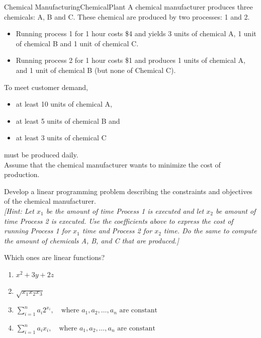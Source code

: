 \begin{ex}{Chemical Manufacturing}{ChemicalPlant}{}
\label{ex:ChemicalPlant}
 A chemical manufacturer produces three chemicals: A, B and C. These chemical are produced by two processes: 1 and 2. 
\begin{itemize}
\item Running process 1 for 1 hour costs \$4 and yields 3 units of chemical A, 1 unit of chemical B and 1 unit of chemical C. 
\item Running process 2 for 1 hour costs \$1 and produces 1 units of chemical A, and 1 unit of chemical B (but none of Chemical C). 
\end{itemize}
To meet customer demand, 
\begin{itemize}
\item at least 10 units of chemical A, 
\item at least 5 units of chemical B and 
\item at least 3 units of chemical C
\end{itemize}
must be produced daily.\\

 Assume that the chemical manufacturer wants to minimize the cost of production. 

Develop a linear programming problem describing the constraints and objectives of the chemical manufacturer. \\


\emph{[Hint: Let $x_1$ be the amount of time Process 1 is executed and let $x_2$ be amount of time Process 2 is executed. Use the coefficients above to express the cost of running Process 1 for $x_1$ time and Process 2 for $x_2$ time. Do the same to compute the amount of chemicals A, B, and C that are produced.]}
\end{ex}


\begin{ex}{}{}
Which ones are linear functions?
\begin{enumerate}
    \item $x^2 + 3y + 2z$
    \item $\sqrt{x_1 x_2 x_3}$
    \item $\sum_{i=1}^n a_i 2^{x_i}, \quad \text{where } a_1, a_2, \dots, a_n \text{ are constant}$
    \item $\sum_{i=1}^n a_i x_i, \quad \text{where } a_1, a_2, \dots, a_n \text{ are constant}$
\end{enumerate}
\end{ex}


